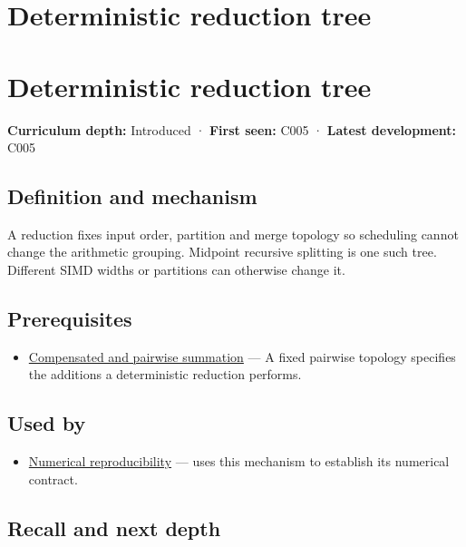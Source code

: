 \hypertarget{appendix-4c8e0238e7ee}{}
\section*{Deterministic reduction tree}
\section{Deterministic reduction tree}\label{appendix-4c8e0238e7ee-deterministic-reduction-tree}

\textbf{Curriculum depth:} Introduced · \textbf{First seen:} C005 · \textbf{Latest development:} C005

\subsection{Definition and mechanism}\label{appendix-4c8e0238e7ee-definition-and-mechanism}

A reduction fixes input order, partition and merge topology so scheduling cannot change the arithmetic grouping. Midpoint recursive splitting is one such tree. Different SIMD widths or partitions can otherwise change it.

\subsection{Prerequisites}\label{appendix-4c8e0238e7ee-prerequisites}

\begin{itemize}
\tightlist
\item
  \hyperref[appendix-df318da57389]{Compensated and pairwise summation} --- A fixed pairwise topology specifies the additions a deterministic reduction performs.
\end{itemize}

\subsection{Used by}\label{appendix-4c8e0238e7ee-used-by}

\begin{itemize}
\tightlist
\item
  \hyperref[appendix-5f1a2c3f97ff]{Numerical reproducibility} --- uses this mechanism to establish its numerical contract.
\end{itemize}

\subsection{Recall and next depth}\label{appendix-4c8e0238e7ee-recall-and-next-depth}


